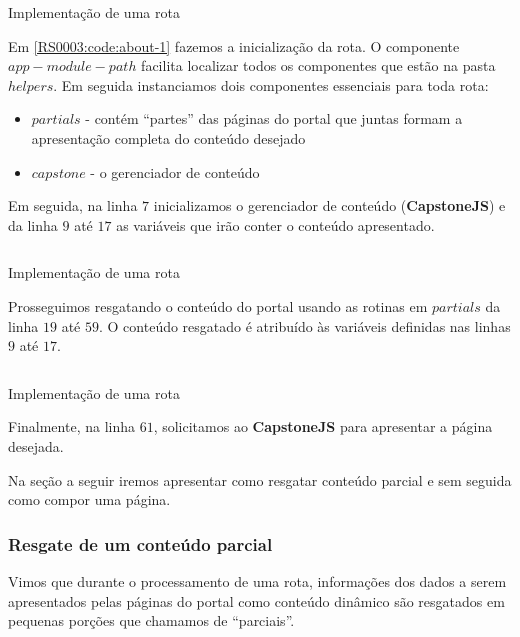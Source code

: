 \begin{code}
    \inputminted[label=about.js,firstline=1,lastline=18]{JavaScript}{../RS0003/anexos/about.js}
    \caption{Implementação de uma rota}\label{RS0003:code:about-1}
\end{code}

Em \ref{RS0003:code:about-1} fazemos a inicialização da rota. O componente $app-module-path$ facilita localizar todos os componentes que estão na pasta $helpers$. Em seguida instanciamos dois componentes essenciais para toda rota:

\begin{itemize}
    \item $partials$ - contém ``partes'' das páginas do portal que juntas formam a apresentação completa do conteúdo desejado
    \item $capstone$ - o gerenciador de conteúdo
\end{itemize}

Em seguida, na linha $7$ inicializamos o gerenciador de conteúdo (\textbf{CapstoneJS}) e da linha $9$ até $17$ as variáveis que irão conter o conteúdo apresentado.

\begin{code}
    \inputminted[label=about.js,firstline=18,lastline=60]{JavaScript}{../RS0003/anexos/about.js}
    \caption{Implementação de uma rota}\label{RS0003:code:about-2}
\end{code}

Prosseguimos resgatando o conteúdo do portal usando as rotinas em $partials$ da linha $19$ até $59$. O conteúdo resgatado é atribuído às variáveis definidas nas linhas $9$ até $17$.

\begin{code}
    \inputminted[label=about.js,firstline=60,lastline=62]{JavaScript}{../RS0003/anexos/about.js}
    \caption{Implementação de uma rota}\label{RS0003:code:about-3}
\end{code}

Finalmente, na linha $61$, solicitamos ao \textbf{CapstoneJS} para apresentar a página desejada.

Na seção a seguir iremos apresentar como resgatar conteúdo parcial e sem seguida como compor uma página.

\subsubsection{Resgate de um conteúdo parcial}

Vimos que durante o processamento de uma rota, informações dos dados a serem apresentados pelas páginas do portal como conteúdo dinâmico são resgatados em pequenas porções que chamamos de ``parciais''.

